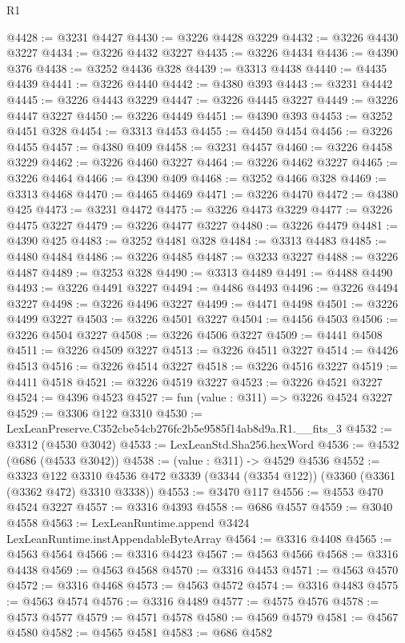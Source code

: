 \begin{lexlean}{R1}
\begin{coremodule}
@4428 := @3231 @4427
@4430 := @3226 @4428 @3229
@4432 := @3226 @4430 @3227
@4434 := @3226 @4432 @3227
@4435 := @3226 @4434
@4436 := @4390 @376
@4438 := @3252 @4436 @328
@4439 := @3313 @4438
@4440 := @4435 @4439
@4441 := @3226 @4440
@4442 := @4380 @393
@4443 := @3231 @4442
@4445 := @3226 @4443 @3229
@4447 := @3226 @4445 @3227
@4449 := @3226 @4447 @3227
@4450 := @3226 @4449
@4451 := @4390 @393
@4453 := @3252 @4451 @328
@4454 := @3313 @4453
@4455 := @4450 @4454
@4456 := @3226 @4455
@4457 := @4380 @409
@4458 := @3231 @4457
@4460 := @3226 @4458 @3229
@4462 := @3226 @4460 @3227
@4464 := @3226 @4462 @3227
@4465 := @3226 @4464
@4466 := @4390 @409
@4468 := @3252 @4466 @328
@4469 := @3313 @4468
@4470 := @4465 @4469
@4471 := @3226 @4470
@4472 := @4380 @425
@4473 := @3231 @4472
@4475 := @3226 @4473 @3229
@4477 := @3226 @4475 @3227
@4479 := @3226 @4477 @3227
@4480 := @3226 @4479
@4481 := @4390 @425
@4483 := @3252 @4481 @328
@4484 := @3313 @4483
@4485 := @4480 @4484
@4486 := @3226 @4485
@4487 := @3233 @3227
@4488 := @3226 @4487
@4489 := @3253 @328
@4490 := @3313 @4489
@4491 := @4488 @4490
@4493 := @3226 @4491 @3227
@4494 := @4486 @4493
@4496 := @3226 @4494 @3227
@4498 := @3226 @4496 @3227
@4499 := @4471 @4498
@4501 := @3226 @4499 @3227
@4503 := @3226 @4501 @3227
@4504 := @4456 @4503
@4506 := @3226 @4504 @3227
@4508 := @3226 @4506 @3227
@4509 := @4441 @4508
@4511 := @3226 @4509 @3227
@4513 := @3226 @4511 @3227
@4514 := @4426 @4513
@4516 := @3226 @4514 @3227
@4518 := @3226 @4516 @3227
@4519 := @4411 @4518
@4521 := @3226 @4519 @3227
@4523 := @3226 @4521 @3227
@4524 := @4396 @4523
@4527 := fun (value : @311) => @3226 @4524 @3227
@4529 := @3306 @122 @3310
@4530 := LexLeanPreserve.C352cbe54cb276fc2b5e9585f14ab8d9a.R1.__fits_3
@4532 := @3312 (@4530 @3042)
@4533 := LexLeanStd.Sha256.hexWord
@4536 := @4532 (@686 (@4533 @3042))
@4538 := (value : @311) -> @4529 @4536
@4552 := @3323
    @122
    @3310
    @4536
    @472
    @3339
    (@3344 (@3354 @122))
    (@3360 (@3361 (@3362 @472) @3310 @3338))
@4553 := @3470 @117
@4556 := @4553 @470 @4524 @3227
@4557 := @3316 @4393
@4558 := @686 @4557
@4559 := @3040 @4558
@4563 := LexLeanRuntime.append @3424 LexLeanRuntime.instAppendableByteArray
@4564 := @3316 @4408
@4565 := @4563 @4564
@4566 := @3316 @4423
@4567 := @4563 @4566
@4568 := @3316 @4438
@4569 := @4563 @4568
@4570 := @3316 @4453
@4571 := @4563 @4570
@4572 := @3316 @4468
@4573 := @4563 @4572
@4574 := @3316 @4483
@4575 := @4563 @4574
@4576 := @3316 @4489
@4577 := @4575 @4576
@4578 := @4573 @4577
@4579 := @4571 @4578
@4580 := @4569 @4579
@4581 := @4567 @4580
@4582 := @4565 @4581
@4583 := @686 @4582

\end{coremodule}
\end{lexlean}
